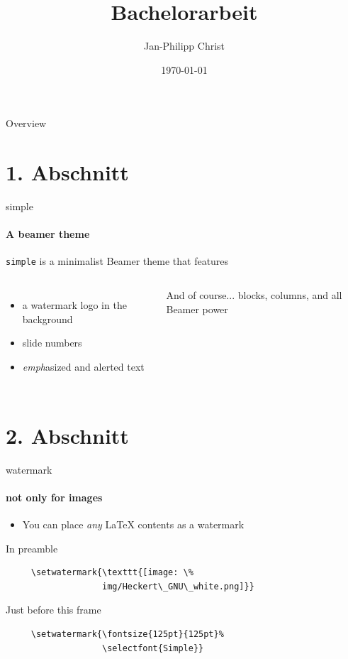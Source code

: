 \documentclass{beamer}
\title{Bachelorarbeit}
\subtitle{}
\date{\today}
\author{Jan-Philipp Christ}
\institute{LMU München}
\begin{document}
\maketitle

\begin{frame}{Overview}
\tableofcontents
\end{frame}

\section{1. Abschnitt}
\begin{frame}{simple}
  \framesubtitle{A beamer theme}

  \texttt{simple} is a minimalist Beamer theme that features

  \begin{columns}
      \begin{itemize}
        \item a \alert{watermark} logo in the background
        \item slide \alert{numbers}
        \item \emph{emph}asized and \alert{alert}ed text
      \end{itemize}

      \begin{block}{And of course...}
         blocks, columns, and all Beamer power
      \end{block}
  \end{columns}
  
\end{frame}



\section{2. Abschnitt}
\begin{frame}[fragile]{watermark}
  \framesubtitle{not only for images}

  \begin{itemize}
    \item You can place \emph{any} \LaTeX{} \alert{contents} as a watermark
  \end{itemize}

  \begin{block}{In preamble}
    \begin{verbatim}
     \setwatermark{\texttt{[image: \%
                   img/Heckert\_GNU\_white.png]}}
    \end{verbatim}
  \end{block}

  \begin{block}{Just before this frame}
    \begin{verbatim}
     \setwatermark{\fontsize{125pt}{125pt}%
                   \selectfont{Simple}}
    \end{verbatim}
  \end{block}


\end{frame}
\end{document}
